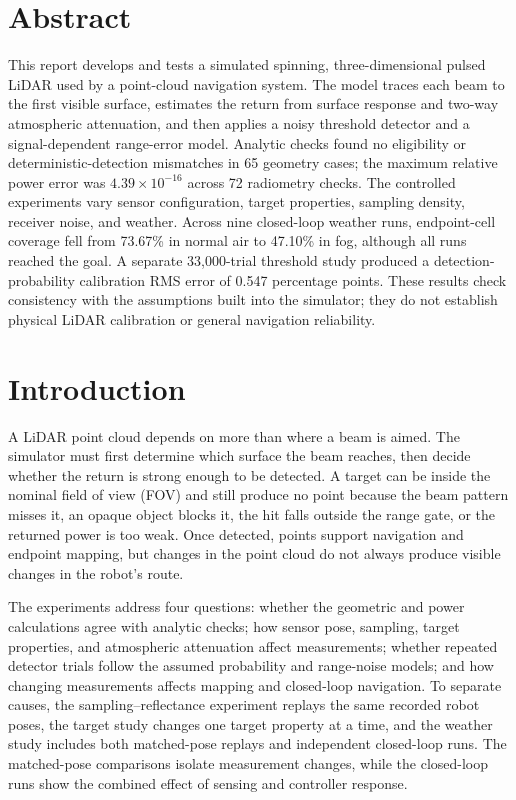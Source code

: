 \documentclass[11pt,letterpaper]{article}
\begin{document}
\section*{Abstract}
This report develops and tests a simulated spinning, three-dimensional pulsed LiDAR used by a point-cloud navigation system. The model traces each beam to the first visible surface, estimates the return from surface response and two-way atmospheric attenuation, and then applies a noisy threshold detector and a signal-dependent range-error model. Analytic checks found no eligibility or deterministic-detection mismatches in 65 geometry cases; the maximum relative power error was $4.39\times10^{-16}$ across 72 radiometry checks. The controlled experiments vary sensor configuration, target properties, sampling density, receiver noise, and weather. Across nine closed-loop weather runs, endpoint-cell coverage fell from 73.67\% in normal air to 47.10\% in fog, although all runs reached the goal. A separate 33,000-trial threshold study produced a detection-probability calibration RMS error of 0.547 percentage points. These results check consistency with the assumptions built into the simulator; they do not establish physical LiDAR calibration or general navigation reliability.

\section{Introduction}\label{sec:introduction}
A LiDAR point cloud depends on more than where a beam is aimed. The simulator must first determine which surface the beam reaches, then decide whether the return is strong enough to be detected. A target can be inside the nominal field of view (FOV) and still produce no point because the beam pattern misses it, an opaque object blocks it, the hit falls outside the range gate, or the returned power is too weak. Once detected, points support navigation and endpoint mapping, but changes in the point cloud do not always produce visible changes in the robot's route.

The experiments address four questions: whether the geometric and power calculations agree with analytic checks; how sensor pose, sampling, target properties, and atmospheric attenuation affect measurements; whether repeated detector trials follow the assumed probability and range-noise models; and how changing measurements affects mapping and closed-loop navigation. To separate causes, the sampling--reflectance experiment replays the same recorded robot poses, the target study changes one target property at a time, and the weather study includes both matched-pose replays and independent closed-loop runs. The matched-pose comparisons isolate measurement changes, while the closed-loop runs show the combined effect of sensing and controller response.
\end{document}
